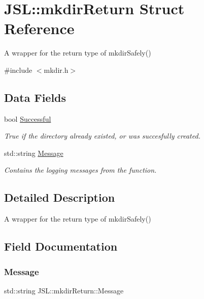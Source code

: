 \hypertarget{structJSL_1_1mkdirReturn}{}\section{J\+SL\+:\+:mkdir\+Return Struct Reference}
\label{structJSL_1_1mkdirReturn}


A wrapper for the return type of mkdir\+Safely()  




{\ttfamily \#include $<$mkdir.\+h$>$}

\subsection*{Data Fields}
\begin{DoxyCompactItemize}
\item 
bool \hyperlink{structJSL_1_1mkdirReturn_a76abe5af61a20e13756f833b79782b7f}{Successful}
\begin{DoxyCompactList}\small\item\em True if the directory already existed, or was succesfully created. \end{DoxyCompactList}\item 
std\+::string \hyperlink{structJSL_1_1mkdirReturn_a64650d2f4b3d2ca29de3a4dcfdadbd0e}{Message}
\begin{DoxyCompactList}\small\item\em Contains the logging messages from the function. \end{DoxyCompactList}\end{DoxyCompactItemize}


\subsection{Detailed Description}
A wrapper for the return type of mkdir\+Safely() 

\subsection{Field Documentation}
\mbox{\label{structJSL_1_1mkdirReturn_a64650d2f4b3d2ca29de3a4dcfdadbd0e}} 
\subsubsection{\texorpdfstring{Message}{Message}}
{\footnotesize\ttfamily std\+::string J\+S\+L\+::mkdir\+Return\+::\+Message}




